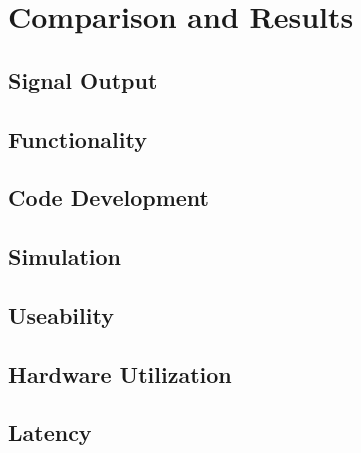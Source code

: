\chapter{Comparison and Results}
\label{cha:ComparisonAndResults}
  \section{Signal Output}

  \section{Functionality}


  \section{Code Development}

  \section{Simulation}

  \section{Useability}

  \section{Hardware Utilization}

  \section{Latency}

